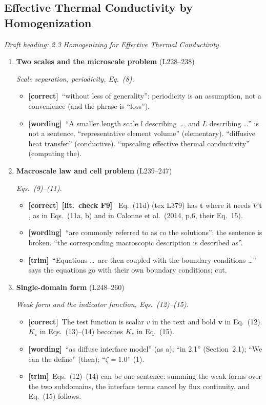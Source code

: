\documentclass[11pt]{article}
\newcommand{\Pg}[3]{\item \textbf{#1} {\small(#2)}\par\textit{#3}}
\newcommand{\tC}{\textcolor{miss}{\textbf{[correct]}}\ }
\newcommand{\tG}{\textcolor{stale}{\textbf{[wording]}}\ }
\newcommand{\tT}{\textcolor{cut}{\textbf{[trim]}}\ }
\newcommand{\Chk}[1]{\textcolor{chk}{\textbf{[lit.\ check #1]}}\ }
\begin{document}
\subsection{Effective Thermal Conductivity by Homogenization}
\textit{Draft heading: 2.3 Homogenizing for Effective Thermal Conductivity.}
\begin{enumerate}
\Pg{Two scales and the microscale problem}{L228--238}{Scale separation, periodicity, Eq.~(8).}
  \begin{itemize}
  \item \tC ``without less of generality'': periodicity is an assumption,
    not a convenience (and the phrase is ``loss'').
  \item \tG ``A smaller length scale $l$ describing \ldots, and $L$
    describing \ldots'' is not a sentence. ``representative element
    volume'' (elementary). ``diffusive heat transfer'' (conductive).
    ``upscaling effective thermal conductivity'' (computing the).
  \end{itemize}
\Pg{Macroscale law and cell problem}{L239--247}{Eqs.~(9)--(11).}
  \begin{itemize}
  \item \tC \Chk{F9} Eq.~(11d) (tex L379) has $\mathbf{t}$ where it needs
    $\nabla\mathbf{t}$, as in Eqs.~(11a, b) and in Calonne et al.\ (2014,
    p.6, their Eq.~15).
  \item \tG ``are commonly referred to as co the solutions'': the sentence
    is broken. ``the corresponding macroscopic description is described
    as''.
  \item \tT ``Equations \ldots\ are then coupled with the boundary conditions
    \ldots'' says the equations go with their own boundary conditions; cut.
  \end{itemize}
\Pg{Single-domain form}{L248--260}{Weak form and the indicator function, Eqs.~(12)--(15).}
  \begin{itemize}
  \item \tC The test function is scalar $v$ in the text and bold
    $\mathbf{v}$ in Eq.~(12). $K_\star$ in Eqs.~(13)--(14) becomes $K_{*}$
    in Eq.~(15).
  \item \tG ``as diffuse interface model'' (as a); ``in 2.1'' (Section~2.1);
    ``We can the define'' (then); ``$\zeta = 1.0$'' (1).
  \item \tT Eqs.~(12)--(14) can be one sentence: summing the weak forms over
    the two subdomains, the interface terms cancel by flux continuity, and
    Eq.~(15) follows.
  \end{itemize}

\end{enumerate}
\end{document}
